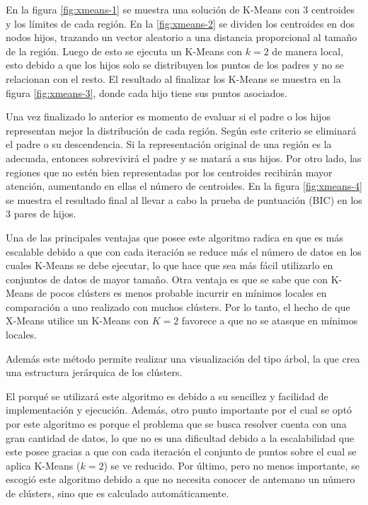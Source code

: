 En la figura \ref{fig:xmeans-1} se muestra una solución de K-Means con 3 centroides y los límites de cada región. En la \ref{fig:xmeans-2} se dividen los centroides en dos nodos hijos, trazando un vector aleatorio a una distancia proporcional al tamaño de la región. Luego de esto se ejecuta un K-Means con $k = 2$ de manera local, esto debido a que los hijos solo se distribuyen los puntos de los padres y no se relacionan con el resto. El resultado al finalizar los K-Means se muestra en la figura \ref{fig:xmeans-3}, donde cada hijo tiene sus puntos asociados.

Una vez finalizado lo anterior es momento de evaluar si el padre o los hijos representan mejor la distribución de cada región. Según este criterio se eliminará el padre o su descendencia. Si la representación original de una región es la adecuada, entonces sobrevivirá el padre y se matará a sus hijos. Por otro lado, las regiones que no estén bien representadas por los centroides recibirán mayor atención, aumentando en ellas el número de centroides. En la figura \ref{fig:xmeans-4} se muestra el resultado final al llevar a cabo la prueba de puntuación (BIC) en los 3 pares de hijos.

Una de las principales ventajas que posee este algoritmo radica en que es más escalable debido a que con cada iteración se reduce más el número de datos en los cuales K-Means se debe ejecutar, lo que hace que sea más fácil utilizarlo en conjuntos de datos de mayor tamaño. Otra ventaja es que se sabe que con K-Means de pocos clústers es menos probable incurrir en mínimos locales en comparación a uno realizado con muchos clústers. Por lo tanto, el hecho de que X-Means utilice un K-Means con $K=2$ favorece a que no se atasque en mínimos locales.

Además este método permite realizar una visualización del tipo árbol, la que crea una estructura jerárquica de los clústers.

El porqué se utilizará este algoritmo es debido a su sencillez y facilidad de implementación y ejecución. Además, otro punto importante por el cual se optó por este algoritmo es porque el problema que se busca resolver cuenta con una gran cantidad de datos, lo que no es una dificultad debido a la escalabilidad que este posee gracias a que con cada iteración el conjunto de puntos sobre el cual se aplica K-Means ($k=2$) se ve reducido. Por último, pero no menos importante, se escogió este algoritmo debido a que no necesita conocer de antemano un número de clústers, sino que es calculado automáticamente.

